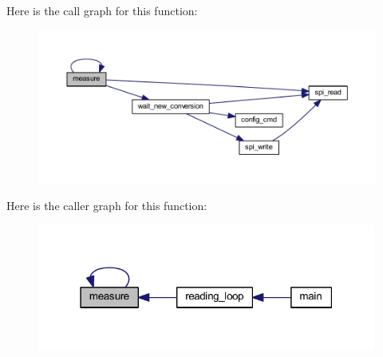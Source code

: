 Here is the call graph for this function\-:\nopagebreak
\begin{figure}[H]
\begin{center}
\leavevmode
\includegraphics[width=350pt]{da/da0/a00009_gac914ebaa64afce03ee852af09659cf69_cgraph}
\end{center}
\end{figure}




Here is the caller graph for this function\-:\nopagebreak
\begin{figure}[H]
\begin{center}
\leavevmode
\includegraphics[width=316pt]{da/da0/a00009_gac914ebaa64afce03ee852af09659cf69_icgraph}
\end{center}
\end{figure}


